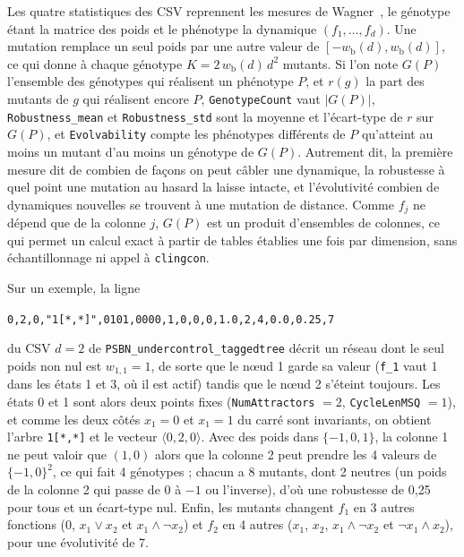 Les quatre statistiques des CSV reprennent les mesures de Wagner~\cite{wagner2008}, le génotype étant la matrice des poids et le phénotype la dynamique $(f_1,\dots,f_d)$.
Une mutation remplace un seul poids par une autre valeur de $[-w_{\mathrm{b}}(d), w_{\mathrm{b}}(d)]$, ce qui donne à chaque génotype $K = 2\,w_{\mathrm{b}}(d)\,d^2$ mutants.
Si l'on note $G(P)$ l'ensemble des génotypes qui réalisent un phénotype $P$, et $r(g)$ la part des mutants de $g$ qui réalisent encore $P$, \texttt{GenotypeCount} vaut $|G(P)|$, \texttt{Robustness\_mean} et \texttt{Robustness\_std} sont la moyenne et l'écart-type de $r$ sur $G(P)$, et \texttt{Evolvability} compte les phénotypes différents de $P$ qu'atteint au moins un mutant d'au moins un génotype de $G(P)$.
Autrement dit, la première mesure dit de combien de façons on peut câbler une dynamique, la robustesse à quel point une mutation au hasard la laisse intacte, et l'évolutivité combien de dynamiques nouvelles se trouvent à une mutation de distance.
Comme $f_j$ ne dépend que de la colonne $j$, $G(P)$ est un produit d'ensembles de colonnes, ce qui permet un calcul exact à partir de tables établies une fois par dimension, sans échantillonnage ni appel à \texttt{clingcon}.

Sur un exemple, la ligne
\begin{center}
\small\texttt{0,2,0,"1[*,*]",0101,0000,1,0,0,0,1.0,2,4,0.0,0.25,7}
\end{center}
du CSV $d=2$ de \texttt{PSBN\_undercontrol\_taggedtree} décrit un réseau dont le seul poids non nul est $w_{1,1} = 1$, de sorte que le nœud 1 garde sa valeur (\texttt{f\_1} vaut 1 dans les états 1 et 3, où il est actif) tandis que le nœud 2 s'éteint toujours.
Les états 0 et 1 sont alors deux points fixes (\texttt{NumAttractors} $= 2$, \texttt{CycleLenMSQ} $= 1$), et comme les deux côtés $x_1 = 0$ et $x_1 = 1$ du carré sont invariants, on obtient l'arbre \texttt{1[*,*]} et le vecteur $\langle 0,2,0\rangle$.
Avec des poids dans $\{-1,0,1\}$, la colonne 1 ne peut valoir que $(1,0)$ alors que la colonne 2 peut prendre les 4 valeurs de $\{-1,0\}^2$, ce qui fait 4 génotypes ; chacun a 8 mutants, dont 2 neutres (un poids de la colonne 2 qui passe de 0 à $-1$ ou l'inverse), d'où une robustesse de 0,25 pour tous et un écart-type nul.
Enfin, les mutants changent $f_1$ en 3 autres fonctions ($0$, $x_1 \lor x_2$ et $x_1 \land \lnot x_2$) et $f_2$ en 4 autres ($x_1$, $x_2$, $x_1 \land \lnot x_2$ et $\lnot x_1 \land x_2$), pour une évolutivité de 7.
